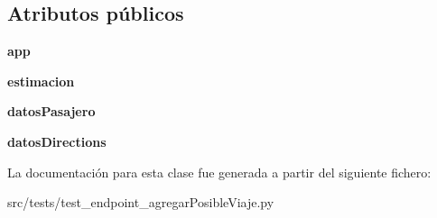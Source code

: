 \subsection*{Atributos públicos}
\begin{DoxyCompactItemize}
\item 
\hypertarget{classsrc_1_1tests_1_1test__endpoint__agregar_posible_viaje_1_1_test_endpoint_agregar_posible_viaje_ab48398059e7f2ce4eb9e299605865fb0}{{\bfseries app}}\label{classsrc_1_1tests_1_1test__endpoint__agregar_posible_viaje_1_1_test_endpoint_agregar_posible_viaje_ab48398059e7f2ce4eb9e299605865fb0}

\item 
\hypertarget{classsrc_1_1tests_1_1test__endpoint__agregar_posible_viaje_1_1_test_endpoint_agregar_posible_viaje_a7054b644acc7c503a9ad06325b884f19}{{\bfseries estimacion}}\label{classsrc_1_1tests_1_1test__endpoint__agregar_posible_viaje_1_1_test_endpoint_agregar_posible_viaje_a7054b644acc7c503a9ad06325b884f19}

\item 
\hypertarget{classsrc_1_1tests_1_1test__endpoint__agregar_posible_viaje_1_1_test_endpoint_agregar_posible_viaje_a3ea88183ffef7e86b255a90b7e326473}{{\bfseries datos\-Pasajero}}\label{classsrc_1_1tests_1_1test__endpoint__agregar_posible_viaje_1_1_test_endpoint_agregar_posible_viaje_a3ea88183ffef7e86b255a90b7e326473}

\item 
\hypertarget{classsrc_1_1tests_1_1test__endpoint__agregar_posible_viaje_1_1_test_endpoint_agregar_posible_viaje_aae380d4b211a2200b599fcbb66e1904a}{{\bfseries datos\-Directions}}\label{classsrc_1_1tests_1_1test__endpoint__agregar_posible_viaje_1_1_test_endpoint_agregar_posible_viaje_aae380d4b211a2200b599fcbb66e1904a}

\end{DoxyCompactItemize}


La documentación para esta clase fue generada a partir del siguiente fichero\-:\begin{DoxyCompactItemize}
\item 
src/tests/test\-\_\-endpoint\-\_\-agregar\-Posible\-Viaje.\-py\end{DoxyCompactItemize}
